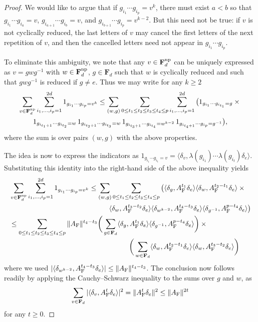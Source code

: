 \documentclass[10pt,reqno]{amsart}
\theoremstyle{definition}
\theoremstyle{remark}
\numberwithin{equation}{section}
\numberwithin{figure}{section}
\numberwithin{table}{section}
\begin{document}
\begin{proof}
We would like to argue that if
$g_{i_1}\cdots g_{i_p}=v^k$, there must exist $a<b$
so that $g_{i_1}\cdots g_{i_a}=v$, $g_{i_{a+1}}\cdots g_{i_b}=v$,
and $g_{i_{b+1}}\cdots g_{i_p}=v^{k-2}$. But this need not be true:
if $v$ is not cyclically reduced, the last letters of $v$
may cancel the first letters of the next repetition of $v$, and then
the cancelled letters need not appear in $g_{i_1}\cdots g_{i_p}$.

To eliminate this ambiguity, we note that any $v\in\mathbf{F}_d^{\rm np}$ 
can be uniquely expressed as $v=gwg^{-1}$ with $w\in\mathbf{F}_d^{\rm np}$,
$g\in\mathbf{F}_d$ such that $w$ is cyclically reduced and
such that $gwg^{-1}$ is reduced if $g\ne e$. Thus we may write for any $k\ge 2$
\begin{multline*}
	\sum_{v\in\mathbf{F}_d^{\rm np}}
	\sum_{i_1,\ldots,i_p=1}^{2d}
	1_{g_{i_1}\cdots g_{i_p} = v^k}
	\le
	\sum_{(w,g)}
	\sum_{0\le t_1\le t_2\le t_3\le t_4\le p}
	\sum_{i_1,\ldots,i_p=1}^{2d}
	\big(
	1_{g_{i_1}\cdots g_{i_{t_1}}=g} 
\times \mbox{}
\\
	1_{g_{i_{t_1+1}}\cdots g_{i_{t_2}}=w}\,
	1_{g_{i_{t_2+1}}\cdots g_{i_{t_3}}=w}\,
	1_{g_{i_{t_3+1}}\cdots g_{i_{t_4}}=w^{k-2}}\,
	1_{g_{i_{t_4+1}}\cdots g_{i_{p}}=g^{-1}}
	\big),
\end{multline*}
where the sum is over pairs $(w,g)$ with the above properties.

The idea is now to express the indicators as
$1_{g_{i_1}\cdots g_{i_t}=v} = 
\langle \delta_v,\lambda(g_{i_1})\cdots\lambda(g_{i_t})\delta_e\rangle$.
Substituting this identity into the right-hand side of the above
inequality yields
\begin{align*}
	&\sum_{v\in\mathbf{F}_d^{\rm np}}
	\sum_{i_1,\ldots,i_p=1}^{2d}
	1_{g_{i_1}\cdots g_{i_p} = v^k}
	\le 
	\sum_{(w,g)}
	\sum_{0\le t_1\le t_2\le t_3\le t_4\le p}
	\big(
	\langle \delta_g,A_{\rm F}^{t_1}\delta_e\rangle
	\langle \delta_w,A_{\rm F}^{t_2-t_1}\delta_e\rangle
	\times\mbox{}\\
	&
\hspace*{5cm}
	\langle \delta_w,A_{\rm F}^{t_3-t_2}\delta_e\rangle
	\langle \delta_{w^{k-2}},A_{\rm F}^{t_4-t_3}\delta_e\rangle
	\langle \delta_{g^{-1}},A_{\rm F}^{p-t_4}\delta_e\rangle
	\big)
	\\
&
	\le
	\sum_{0\le t_1\le t_2\le t_3\le t_4\le p}
	\|A_{\rm F}\|^{t_4-t_3}
	\bigg(
	\sum_{g\in\mathbf{F}_d}
	\langle \delta_g,A_{\rm F}^{t_1}\delta_e\rangle
	\langle \delta_{g^{-1}},A_{\rm F}^{p-t_4}\delta_e\rangle
	\bigg) \times\mbox{} \\
&
\hspace*{6cm}
	\bigg(
	\sum_{w\in\mathbf{F}_d}
	\langle \delta_w,A_{\rm F}^{t_2-t_1}\delta_e\rangle
	\langle \delta_w,A_{\rm F}^{t_3-t_2}\delta_e\rangle
	\bigg)
\end{align*}
where we used $|\langle \delta_{w^{k-2}},A_{\rm 
F}^{t_4-t_3}\delta_e\rangle|
\le \|A_{\rm F}\|^{t_4-t_3}$.
The conclusion now follows readily by applying
the Cauchy--Schwarz inequality to the sums over $g$ and $w$,
as
$$
	\sum_{v\in\mathbf{F}_d}
	|\langle \delta_v,A_{\rm F}^t\delta_e\rangle|^2
	=\|A_{\rm F}^t\delta_e\|^2 \le \|A_{\rm F}\|^{2t}
$$
for any $t\ge 0$.
\end{proof}
\end{document}
